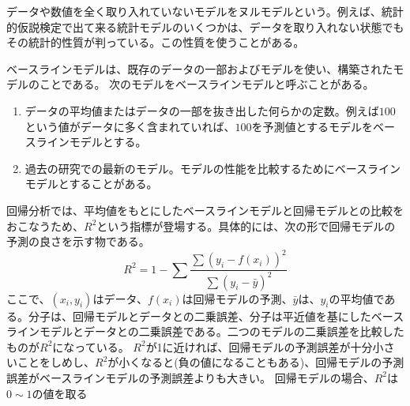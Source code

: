 データや数値を全く取り入れていないモデルをヌルモデルという。例えば、統計的仮説検定で出て来る統計モデルのいくつかは、データを取り入れない状態でもその統計的性質が判っている。この性質を使うことがある。


ベースラインモデルは、既存のデータの一部およびモデルを使い、構築されたモデルのことである。
次のモデルをベースラインモデルと呼ぶことがある。
\begin{enumerate}
 \item データの平均値またはデータの一部を抜き出した何らかの定数。例えば$100$という値がデータに多く含まれていれば、$100$を予測値とするモデルをベースラインモデルとする。
 \item 過去の研究での最新のモデル。モデルの性能を比較するためにベースラインモデルとすることがある。
\end{enumerate}

回帰分析では、平均値をもとにしたベースラインモデルと回帰モデルとの比較をおこなうため、$R^2$という指標が登場する。具体的には、次の形で回帰モデルの予測の良さを示す物である。
\begin{equation}
R^2 = 1- \sum\frac{\sum (y_i-f(x_i))^2}{\sum (y_i-\bar{y})^2}
\end{equation}
ここで、$(x_i,y_i)$はデータ、$f(x_i)$は回帰モデルの予測、$\bar{y}$は、$y_i$の平均値である。分子は、回帰モデルとデータとの二乗誤差、分子は平近値を基にしたベースラインモデルとデータとの二乗誤差である。二つのモデルの二乗誤差を比較したものが$R^2$になっている。
$R^2$が1に近ければ、回帰モデルの予測誤差が十分小さいことをしめし、$R^2$が小くなると(負の値になることもある)、回帰モデルの予測誤差がベースラインモデルの予測誤差よりも大きい。
回帰モデルの場合、$R^2$は$0\sim 1$の値を取る


